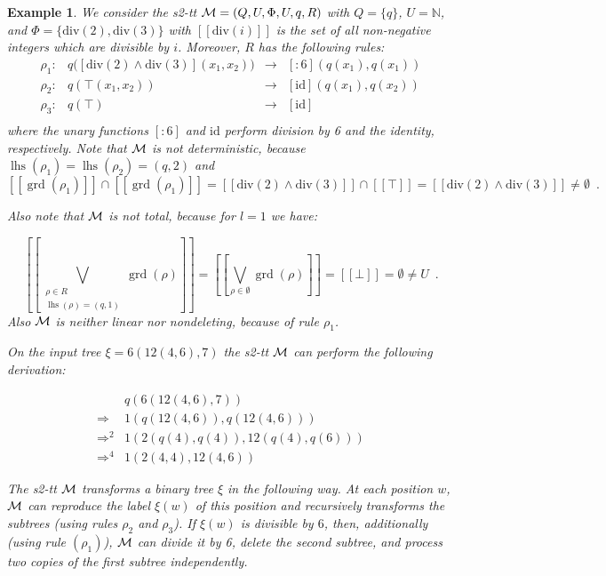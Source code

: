 \documentclass[10pt]{scrartcl}
\newtheorem{ex}[df]{Example}
\newcommand{\seml}{[\![}
\newcommand{\semr}{]\!]}
\DeclareMathOperator{\grd}{grd}
\DeclareMathOperator{\lhs}{lhs}
\begin{document}
\begin{ex}\rm\label{stt-example}\rm We consider the s2-tt ${\cal M} = (Q,U,\Phi,U,q,R)$
  with $Q = \{q\}$, $U = \mathbb{N}$, and $\Phi = \{\mathrm{div}(2),
  \mathrm{div}(3)\}$ with $\seml \mathrm{div}(i) \semr$ is the set of
  all non-negative integers which are divisible by $i$. Moreover, $R$
  has the following rules:
\[
\begin{array}{lrcl}
\rho_1: & q\big([\mathrm{div}(2)\wedge \mathrm{div}(3)](x_1,x_2)\big) & \rightarrow &
[:6](q(x_1),q(x_1))\\
\rho_2: & q(\top(x_1,x_2)) & \rightarrow & [\mathrm{id}](q(x_1),q(x_2))\\
\rho_3: & q(\top) & \rightarrow & [\mathrm{id}]\\
\end{array}
\]
where the unary functions $[:6]$ and $\mathrm{id}$ perform division by
6 and the identity, respectively. Note that ${\cal M}$ is
not deterministic, because $\lhs(\rho_1) =
\lhs(\rho_2) = (q,2)$ and 
\[
\seml \grd(\rho_1) \semr \cap \seml \grd(\rho_1)\semr = 
\seml \mathrm{div}(2)\wedge \mathrm{div}(3) \semr \cap \seml \top
\semr = \seml \mathrm{div}(2)\wedge \mathrm{div}(3) \semr \not= \emptyset\enspace.
\] 

Also note that ${\cal M}$ is not total, because for $l=1$ we have:

\[
\seml \bigvee_{\substack{\rho\in R \\ \lhs(\rho)=(q,1)}}
\grd(\rho)\semr = 
\seml \bigvee_{\rho\in \emptyset} \grd(\rho)\semr = 
\seml \bot \semr = \emptyset \not= U\enspace.
\]
Also ${\cal M}$ is neither linear nor nondeleting, because of rule $\rho_1$.

On the input tree $\xi = 6(12(4,6),7)$ the s2-tt ${\cal M}$ can perform
  the following derivation:

\[
\begin{array}{cl}
    & q(6(12(4,6),7)) \\
\Rightarrow & 1(q(12(4,6)), q(12(4,6))) \\
\Rightarrow^2 & 1(2(q(4),q(4)), 12(q(4),q(6))) \\
\Rightarrow^4 & 1(2(4,4), 12(4,6))
\end{array}
\]

The s2-tt ${\cal M}$ transforms a binary tree $\xi$ in the following
way. At each position $w$, ${\cal M}$ can reproduce the label $\xi(w)$ of this
position and recursively transforms the subtrees (using rules $\rho_2$
and $\rho_3$). If $\xi(w)$ is
divisible by $6$, then, additionally (using rule $(\rho_1)$), ${\cal
  M}$ can divide it by 6, delete the second subtree, and process two copies of the first
subtree independently.  
\end{ex}
\end{document}
